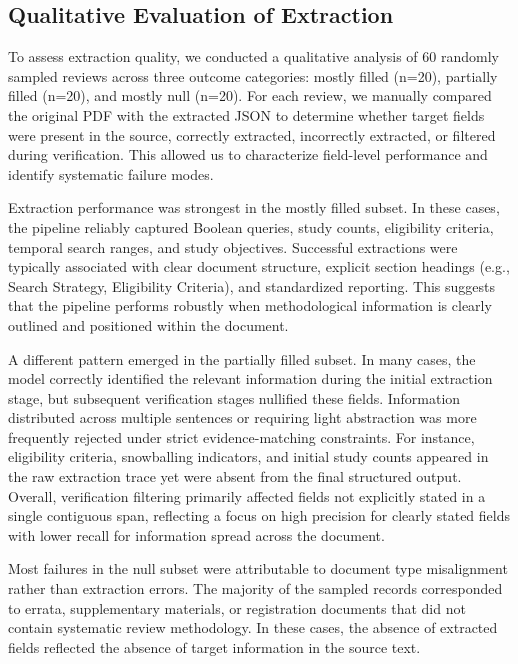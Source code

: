 \subsection{Qualitative Evaluation of Extraction}
To assess extraction quality, we conducted a qualitative analysis of 60 randomly sampled reviews across three outcome categories: mostly filled (n=20), partially filled (n=20), and mostly null (n=20). For each review, we manually compared the original PDF with the extracted JSON to determine whether target fields were present in the source, correctly extracted, incorrectly extracted, or filtered during verification. This allowed us to characterize field-level performance and identify systematic failure modes.

Extraction performance was strongest in the mostly filled subset. In these cases, the pipeline reliably captured Boolean queries, study counts, eligibility criteria, temporal search ranges, and study objectives. Successful extractions were typically associated with clear document structure, explicit section headings (e.g., Search Strategy, Eligibility Criteria), and standardized reporting. This suggests that the pipeline performs robustly when methodological information is clearly outlined and positioned within the document.

A different pattern emerged in the partially filled subset. In many cases, the model correctly identified the relevant information during the initial extraction stage, but subsequent verification stages nullified these fields. Information distributed across multiple sentences or requiring light abstraction was more frequently rejected under strict evidence-matching constraints. For instance, eligibility criteria, snowballing indicators, and initial study counts appeared in the raw extraction trace yet were absent from the final structured output. Overall, verification filtering primarily affected fields not explicitly stated in a single contiguous span, reflecting a focus on high precision for clearly stated fields with lower recall for information spread across the document.

Most failures in the null subset were attributable to document type misalignment rather than extraction errors. The majority of the sampled records corresponded to errata, supplementary materials, or registration documents that did not contain systematic review methodology. In these cases, the absence of extracted fields reflected the absence of target information in the source text.


